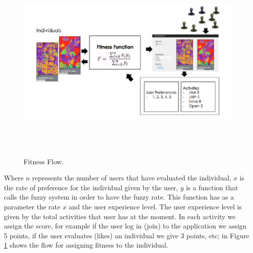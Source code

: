 \begin{figure}
\captionsetup{justification=centering,margin=2cm}
\centering
\setlength\fboxsep{0pt}
\setlength\fboxrule{0.7pt}
\includegraphics[width=12cm,height=10cm,keepaspectratio]{img/fitnessFlow.png}
\caption{Fitness Flow.}
\label{fig:fitnessFlow}
\end{figure}



Where $n$ represents the number of users that have evaluated the
individual, $x$ is the rate of preference for the individual given by the user,
$y$ is a function that calls the fuzzy system in order to have the fuzzy rate.
This function has as a parameter the rate $x$ and the user experience level.
The user experience level
is given by the total activities that user has at the moment. In each
activity we assign the score, for example if the user log in (join) to the
application we assign 5 points, if the user evaluates (likes) an individual we
give 3 points, etc; in Figure \ref{fig:fitnessFlow} shows the flow for assigning fitness to
the individual.
